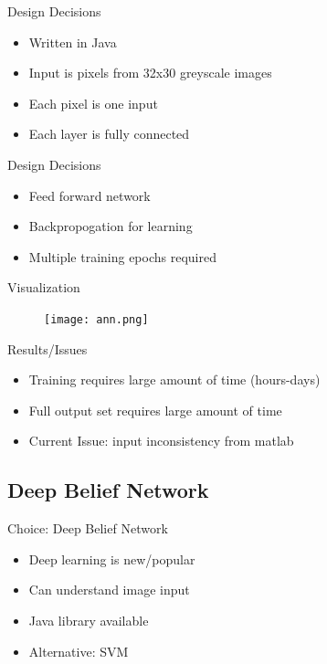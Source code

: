 \documentclass{beamer}
\begin{document}
\begin{frame}{Design Decisions}
\begin{itemize}
\item Written in Java
\item Input is pixels from 32x30 greyscale images
\item Each pixel is one input
\item Each layer is fully connected
\end{itemize}
\end{frame}

\begin{frame}{Design Decisions}
\begin{itemize}
\item Feed forward network
\item Backpropogation for learning
\item Multiple training epochs required
\end{itemize}
\end{frame}

\begin{frame}{Visualization}
\begin{figure}
\texttt{[image: ann.png]}
\end{figure}
\end{frame}

\begin{frame}{Results/Issues}
\begin{itemize}
\item Training requires large amount of time (hours-days)
\item Full output set requires large amount of time
\item Current Issue: input inconsistency from matlab
\end{itemize}
\end{frame}

\subsection{Deep Belief Network}
\begin{frame}{Choice: Deep Belief Network}
\begin{itemize}
\item Deep learning is new/popular
\item Can understand image input
\item Java library available
\item Alternative: SVM
\end{itemize}
\end{frame}
\end{document}
